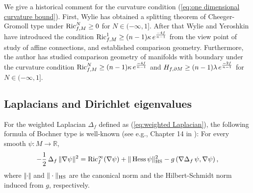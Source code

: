 \begin{rem}
We give a historical comment for the curvature condition (\ref{eq:one dimensional curvature bound}).
First,
Wylie \cite{W} has obtained a splitting theorem of Cheeger-Gromoll type under $\operatorname{Ric}^{N}_{f,M}\geq 0$ for $N\in (-\infty,1]$.
After that
Wylie and Yeroshkin \cite{WY} have introduced the condition $\operatorname{Ric}^{1}_{f,M}\geq (n-1)\kappa\, e^{\frac{-4f}{n-1}}$ from the view point of study of affine connections,
and established comparison geometry.
Furthermore,
the author \cite{S2} has studied comparison geometry of manifolds with boundary under the curvature condition $\operatorname{Ric}^{N}_{f,M}\geq (n-1)\kappa\, e^{\frac{-4f}{n-1}}$ and $H_{f,\partial M}\geq (n-1)\lambda\, e^{\frac{-2f}{n-1}}$ for $N\in (-\infty,1]$.
\end{rem}

\subsection{Laplacians and Dirichlet eigenvalues}
For the weighted Laplacian $\Delta_{f}$ defined as (\ref{eq:weighted Laplacian}),
the following formula of Bochner type is well-known (see e.g., Chapter 14 in \cite{V}):
For every smooth $\psi:M\to \mathbb{R}$,
\begin{equation}\label{eq:Bochner formula}
-\frac{1}{2}\,\Delta_{f}\,\Vert \nabla \psi \Vert^{2}=\operatorname{Ric}^{\infty}_{f}(\nabla \psi)+\Vert \operatorname{Hess} \psi \Vert^{2}_{\operatorname{HS}}-g\left(\nabla \Delta_{f}\,\psi,\nabla \psi \right),
\end{equation}
where $\Vert \cdot \Vert$ and $\Vert \cdot \Vert_{\operatorname{HS}}$ are the canonical norm and the Hilbert-Schmidt norm induced from $g$,
respectively.

